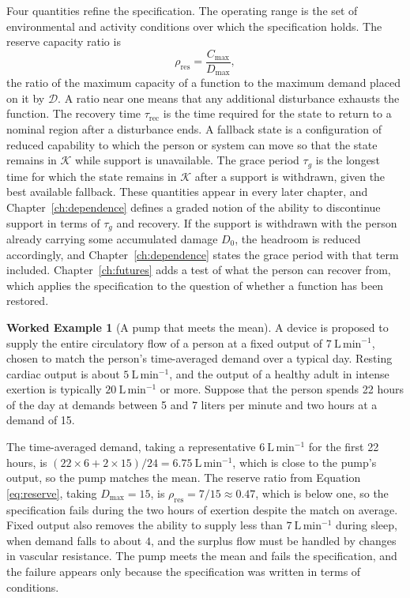 \documentclass[11pt,openany]{book}
\theoremstyle{definition}
\newtheorem{example}{Worked Example}[chapter]
\theoremstyle{remark}
\newcommand{\Kset}{\mathcal{K}}
\newcommand{\Dset}{\mathcal{D}}
\begin{document}
Four quantities refine the specification. The operating range is the set of environmental and activity conditions over which the specification holds. The reserve capacity ratio is
\begin{equation}
\rho_{\mathrm{res}}=\frac{C_{\max}}{D_{\max}},
\label{eq:reserve}
\end{equation}
the ratio of the maximum capacity of a function to the maximum demand placed on it by $\Dset$. A ratio near one means that any additional disturbance exhausts the function. The recovery time $\tau_{\mathrm{rec}}$ is the time required for the state to return to a nominal region after a disturbance ends. A fallback state is a configuration of reduced capability to which the person or system can move so that the state remains in $\Kset$ while support is unavailable. The grace period $\tau_g$ is the longest time for which the state remains in $\Kset$ after a support is withdrawn, given the best available fallback. These quantities appear in every later chapter, and Chapter~\ref{ch:dependence} defines a graded notion of the ability to discontinue support in terms of $\tau_g$ and recovery. If the support is withdrawn with the person already carrying some accumulated damage $D_0$, the headroom is reduced accordingly, and Chapter~\ref{ch:dependence} states the grace period with that term included. Chapter~\ref{ch:futures} adds a test of what the person can recover from, which applies the specification to the question of whether a function has been restored.

\begin{example}[A pump that meets the mean]
\label{ex:pump}
A device is proposed to supply the entire circulatory flow of a person at a fixed output of $7\ \mathrm{L\,min^{-1}}$, chosen to match the person's time-averaged demand over a typical day. Resting cardiac output is about $5\ \mathrm{L\,min^{-1}}$, and the output of a healthy adult in intense exertion is typically $20\ \mathrm{L\,min^{-1}}$ or more. Suppose that the person spends 22 hours of the day at demands between 5 and 7 liters per minute and two hours at a demand of 15.

The time-averaged demand, taking a representative $6\ \mathrm{L\,min^{-1}}$ for the first 22 hours, is $(22\times6+2\times15)/24=6.75\ \mathrm{L\,min^{-1}}$, which is close to the pump's output, so the pump matches the mean. The reserve ratio from Equation \eqref{eq:reserve}, taking $D_{\max}=15$, is $\rho_{\mathrm{res}}=7/15\approx0.47$, which is below one, so the specification fails during the two hours of exertion despite the match on average. Fixed output also removes the ability to supply less than $7\ \mathrm{L\,min^{-1}}$ during sleep, when demand falls to about $4$, and the surplus flow must be handled by changes in vascular resistance. The pump meets the mean and fails the specification, and the failure appears only because the specification was written in terms of conditions.
\end{example}
\end{document}
